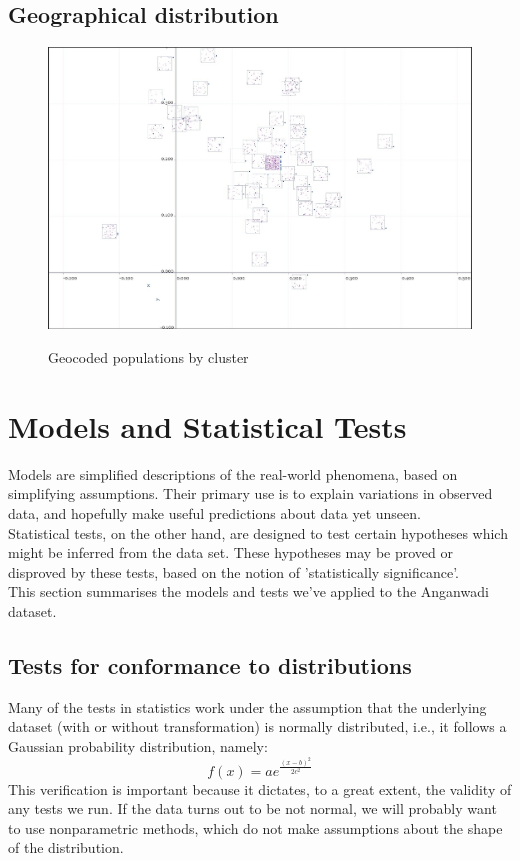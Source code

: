 \documentclass[10pt]{article}
\begin{document}
\newpage
\subsection{Geographical distribution}
\begin{figure}
\caption{Geocoded populations by cluster}
\label{GeographicalDistributionOfPopulation}
\begin{center}
\includegraphics[width=170mm]{ReportMedia/GeographicalDistributionOfPopulation.jpg}\\
\end{center}
\end{figure}
\newpage
\section{Models and Statistical Tests}
Models are simplified descriptions of the real-world phenomena, based on simplifying assumptions. Their primary use is to explain variations in observed data, and hopefully make useful predictions about data yet unseen.\\
Statistical tests, on the other hand, are designed to test certain hypotheses which might be inferred from the data set. These hypotheses may be proved or disproved by these tests, based on the notion of 'statistically significance'.\\ 
This section summarises the models and tests we've applied to the Anganwadi dataset.
\newpage
\subsection{Tests for conformance to distributions}
\newpage
Many of the tests in statistics work under the assumption that the underlying dataset (with or without transformation) is normally distributed, i.e., it follows a Gaussian probability distribution, namely:\\
\[f(x) = a e^ {\frac{(x-b)^2}{2c^2}}\]
This verification is important because it dictates, to a great extent, the validity of any tests we run. If the data turns out to be not normal, we will probably want to use nonparametric methods, which do not make assumptions about the shape of the distribution.
\end{document}
